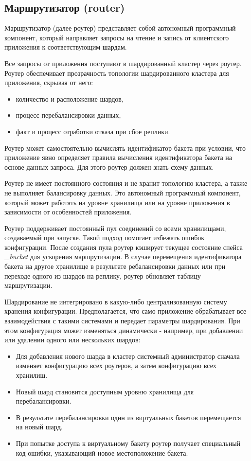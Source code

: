 \subsection{Маршрутизатор (router)}

Маршрутизатор (далее роутер) представляет собой автономный программный
компонент, который направляет запросы на чтение и запись от клиентского
приложения к соответствующим шардам.

Все запросы от приложения поступают в шардированный кластер через роутер.
Роутер обеспечивает прозрачность топологии шардированного кластера для
приложения, скрывая от него:

\begin{itemize}
\item количество и расположение шардов,
\item процесс перебалансировки данных,
\item факт и процесс отработки отказа при сбое реплики.
\end{itemize}

Роутер может самостоятельно вычислять идентификатор бакета при условии, что
приложение явно определяет правила вычисления идентификатора бакета на основе
данных запроса. Для этого роутер должен знать схему данных.

Роутер не имеет постоянного состояния и не хранит топологию кластера, а также
не выполняет балансировку данных. Это автономный программный компонент, который
может работать на уровне хранилища или на уровне приложения в зависимости от
особенностей приложения.

Роутер поддерживает постоянный пул соединений со всеми хранилищами, создаваемый
при запуске. Такой подход помогает избежать ошибок конфигурации. После создания
пула роутер кэширует текущее состояние спейса \textit{_bucket} для ускорения
маршрутизации. В случае перемещения идентификатора бакета на другое хранилище в
результате ребалансировки данных или при переходе одного из шардов на реплику,
роутер обновляет таблицу маршрутизации.

Шардирование не интегрировано в какую-либо централизованную систему хранения
конфигурации. Предполагается, что само приложение обрабатывает все
взаимодействия с такими системами и передает параметры шардирования. При этом
конфигурация может изменяться динамически - например, при добавлении или
удалении одного или нескольких шардов:

\begin{itemize}
\item Для добавления нового шарда в кластер системный администратор сначала
    изменяет конфигурацию всех роутеров, а затем конфигурацию всех хранилищ.
\item Новый шард становится доступным уровню хранилища для перебалансировки.
\item В результате перебалансировки один из виртуальных бакетов перемещается на
    новый шард.
\item При попытке доступа к виртуальному бакету роутер получает специальный код
    ошибки, указывающий новое местоположение бакета.
\end{itemize}

